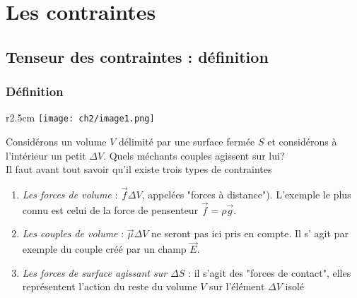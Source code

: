 
\chapter{Les contraintes}
\label{chap:ch2}

\section{Tenseur des contraintes : définition}
    \subsection{Définition}
    \begin{wrapfigure}[7]{r}{2.5cm}
    \texttt{[image: ch2/image1.png]}
    \end{wrapfigure}
    Considérons un volume $V$ délimité par une surface fermée $S$ et considérons à l'intérieur un petit
    $\Delta V$. Quels méchants couples agissent sur lui?\\
    Il faut avant tout savoir qu'il existe trois types de contraintes
    
    \begin{enumerate}
    \item \textit{Les forces de volume} : $\vec f \Delta V$, appelées "forces à distance"). L'exemple le
    plus connu est celui de la force de pensenteur $\vec f = \rho \vec{g}$.
    \item \textit{Les couples de volume} : $\vec{\mu}\Delta V$ ne seront pas ici pris en compte. Il s'
    agit par exemple du couple créé par un champ $\vec{E}$.
    \item \textit{Les forces de surface agissant sur $\Delta S$} : il s'agit des "forces de contact", 
    elles représentent l'action du reste du volume $V$ sur l'élément $\Delta V$ isolé
    \end{enumerate}
        
        
